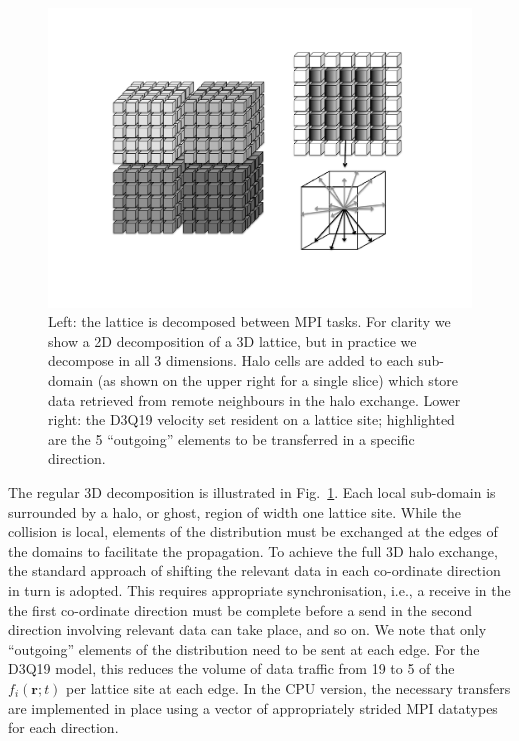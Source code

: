 \begin{figure}[!t]
\centering
\includegraphics[width=12cm]{Chapters/chapter14/figures/decomphalo}
\caption{Left: the lattice is decomposed between MPI tasks. For
  clarity we show a 2D decomposition of a 3D lattice, but in practice
  we decompose in all 3 dimensions. Halo cells are added to each
  sub-domain (as shown on the upper right for a single slice) which store
  data retrieved from remote neighbours in the halo exchange. Lower
  right: the D3Q19 velocity set resident on a lattice site;
  highlighted are the 5 ``outgoing'' elements to be transferred in a
  specific direction.}
\label{ch14:fig:decomphalo}
\end{figure}


The regular 3D decomposition is illustrated in Fig.~\ref{ch14:fig:decomphalo}.
Each local sub-domain is surrounded by a halo, or ghost, region of width one
lattice site. While the collision is local, elements of the distribution
must be exchanged at the edges of the domains to facilitate the propagation.
To achieve the full 3D halo exchange, the standard approach of shifting the
relevant data in each co-ordinate direction in turn is adopted. This
requires appropriate synchronisation, i.e., a receive in the the first
co-ordinate direction must be complete before a send in the second direction
involving relevant data can take place, and so on. We note that only
``outgoing'' elements of the distribution need to be sent at each edge.
For the D3Q19 model, this reduces the volume of data traffic from 19 to
5 of the $f_i(\mathbf{r};t)$ per lattice site at each edge. In the CPU
version, the necessary transfers are implemented in place using
a vector of appropriately strided MPI datatypes for each direction.


